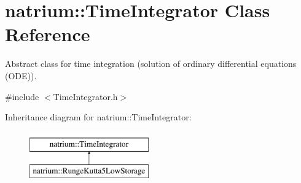 \hypertarget{classnatrium_1_1TimeIntegrator}{\section{natrium\-:\-:Time\-Integrator Class Reference}
\label{classnatrium_1_1TimeIntegrator}
}


Abstract class for time integration (solution of ordinary differential equations (O\-D\-E)).  




{\ttfamily \#include $<$Time\-Integrator.\-h$>$}

Inheritance diagram for natrium\-:\-:Time\-Integrator\-:\begin{figure}[H]
\begin{center}
\leavevmode
\includegraphics[height=2.000000cm]{classnatrium_1_1TimeIntegrator}
\end{center}
\end{figure}
